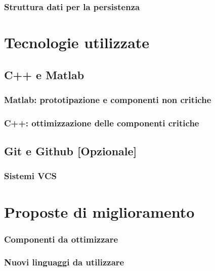             \subsubsection{Struttura dati per la persistenza}
    \section{Tecnologie utilizzate}
        \subsection{C++ e Matlab}
            \subsubsection{Matlab: prototipazione e componenti non critiche}
            \subsubsection{C++: ottimizzazione delle componenti critiche}
        \subsection{Git e Github [Opzionale]}
            \subsubsection{Sistemi VCS}
    \section{Proposte di miglioramento}
        \subsubsection{Componenti da ottimizzare}
        \subsubsection{Nuovi linguaggi da utilizzare}